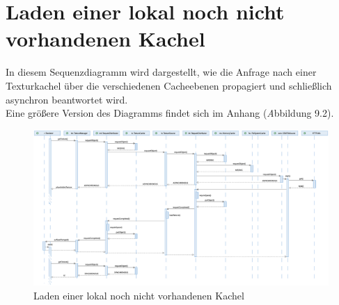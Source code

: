 \documentclass[10pt]{scrreprt}
\newcommand{\textref}[1]{\mbox{\raisebox{0.1ex}{\small$\rightarrow$ }\textit{#1}}}
\begin{document}
\section{Laden einer lokal noch nicht vorhandenen Kachel}

In diesem Sequenzdiagramm wird dargestellt, wie die Anfrage nach einer Texturkachel über die verschiedenen Cacheebenen propagiert und schließlich asynchron beantwortet wird.\\[3mm]
Eine größere Version des Diagramms findet sich im Anhang (\textref Abbildung 9.2).

\vspace*{5mm}
\begin{figure}[h]
\begin{center}
\includegraphics[scale=0.28]{sequenz-osmtile.eps}
\caption{Laden einer lokal noch nicht vorhandenen Kachel}
\end{center}
\end{figure}
\end{document}
